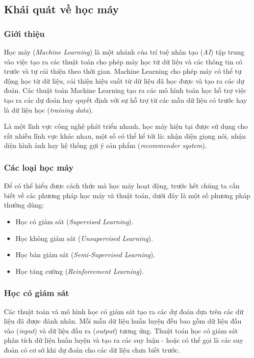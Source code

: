 \subsection{Khái quát về học máy}
\subsubsection{Giới thiệu}
Học máy (\textit{Machine Learning}) là một nhánh của trí tuệ nhân tạo (\textit{AI}) tập trung vào việc tạo ra các thuật toán cho phép máy học từ dữ liệu và các thông tin có trước và tự cải thiện theo thời gian. Machine Learning cho phép máy có thể tự động học từ dữ liệu, cải thiện hiệu suất từ dữ liệu đã học được và tạo ra các dự đoán. Các thuật toán Machine Learning tạo ra các mô hình toán học hỗ trợ việc tạo ra các dự đoán hay quyết định với sự hỗ trợ từ các mẫu dữ liệu có trước hay là dữ liệu học (\textit{training data}).\cite{webpage}

Là một lĩnh vực công nghệ phát triển nhanh, học máy hiện tại được sử dụng cho rất nhiều lĩnh vực khác nhau, một số có thể kể tới là: nhận diện giọng nói, nhận diện hình ảnh hay hệ thống gợi ý sản phẩm (\textit{recommender system}).

\subsubsection{Các loại học máy}
Để có thể hiểu được cách thức mà học máy hoạt động, trước hết chúng ta cần biết về các phương pháp học máy và thuật toán, dưới đây là một số phương pháp thường dùng\cite{webpage}:
\begin{itemize}
    \item Học có giám sát (\textit{Supervised Learning}).
    \item Học không giám sát (\textit{Unsupervised Learning}).
    \item Học bán giám sát (\textit{Semi-Supervised Learning}).
    \item Học tăng cường (\textit{Reinforcement Learning}).
\end{itemize}

\subsubsection{Học có giám sát}
Các thuật toán và mô hình học có giám sát tạo ra các dự đoán dựa trên các dữ liệu đã được đánh nhãn. Mỗi mẫu dữ liệu huấn luyện đều bao gồm dữ liệu đầu vào (\textit{input}) và dữ liệu đầu ra (\textit{output}) tương ứng. Thuật toán học có giám sát phân tích dữ liệu huấn luyện và tạo ra các suy luận - hoặc có thể gọi là các suy đoán có cơ sở khi dự đoán cho các dữ liệu chưa biết trước.\cite{webpage}

